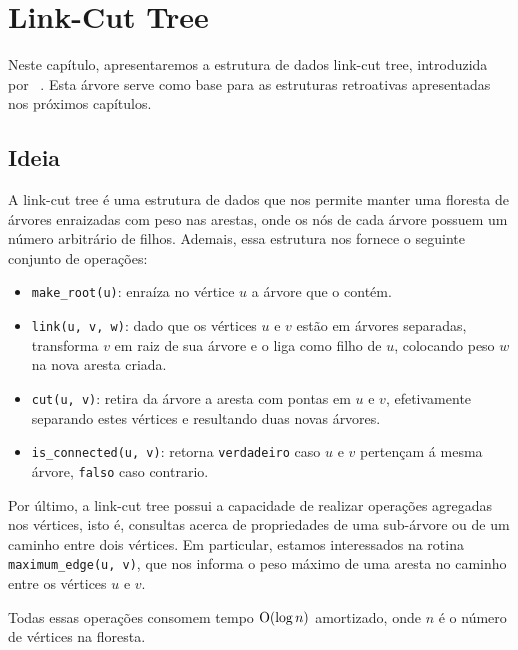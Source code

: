 
\chapter{Link-Cut Tree}
\label{cap:link-cut-trees}

Neste capítulo, apresentaremos a estrutura de dados link-cut tree, introduzida por ~\citet{10.1145/800076.802464}. Esta árvore serve como base para as estruturas retroativas apresentadas nos próximos capítulos.

\section{Ideia}
\label{sec:lct-ideia}

A link-cut tree é uma estrutura de dados que nos permite manter uma floresta de árvores enraizadas com peso nas arestas, onde os nós de cada árvore possuem um número arbitrário de filhos. Ademais, essa estrutura nos fornece o seguinte conjunto de operações:

\begin{itemize}
    \item \texttt{make\_root(u)}: enraíza no vértice $u$ a árvore que o contém.
    \item \texttt{link(u, v, w)}: dado que os vértices $u$ e $v$ estão em árvores separadas, transforma $v$ em raiz de sua árvore e o liga como filho de $u$, colocando peso $w$ na nova aresta criada.
    \item \texttt{cut(u, v)}: retira da árvore a aresta com pontas em $u$ e $v$, efetivamente separando estes vértices e resultando duas novas árvores.
    \item \texttt{is\_connected(u, v)}: retorna \texttt{verdadeiro} caso $u$ e $v$ pertençam á mesma árvore, \texttt{falso} caso contrario.
\end{itemize}

Por último, a link-cut tree possui a capacidade de realizar operações agregadas nos vértices, isto é, consultas acerca de propriedades de uma sub-árvore ou de um caminho entre dois vértices. Em particular, estamos interessados na rotina \texttt{maximum\_edge(u, v)}, que nos informa o peso máximo de uma aresta no caminho entre os vértices $u$ e $v$.

Todas essas operações consomem tempo $\mathrm{O}(\log n)$ amortizado, onde $n$ é o número de vértices na floresta.

